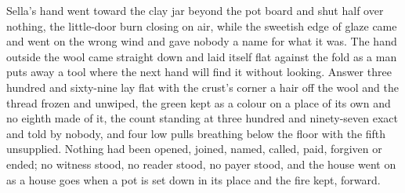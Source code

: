 Sella's hand went toward the clay jar beyond the pot board and shut half over nothing, the little-door burn closing on air, while the sweetish edge of glaze came and went on the wrong wind and gave nobody a name for what it was. The hand outside the wool came straight down and laid itself flat against the fold as a man puts away a tool where the next hand will find it without looking. Answer three hundred and sixty-nine lay flat with the crust's corner a hair off the wool and the thread frozen and unwiped, the green kept as a colour on a place of its own and no eighth made of it, the count standing at three hundred and ninety-seven exact and told by nobody, and four low pulls breathing below the floor with the fifth unsupplied. Nothing had been opened, joined, named, called, paid, forgiven or ended; no witness stood, no reader stood, no payer stood, and the house went on as a house goes when a pot is set down in its place and the fire kept, forward.
